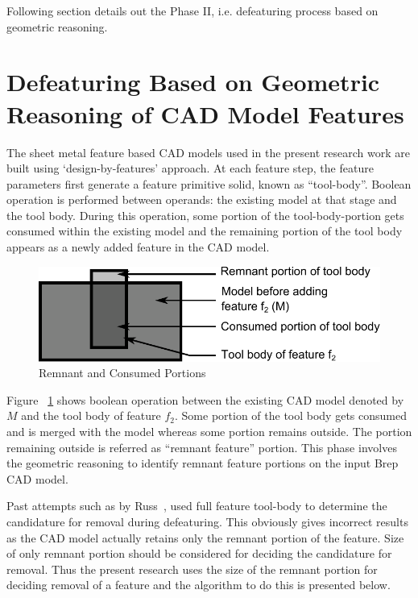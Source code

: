 Following section details out the Phase II, i.e. defeaturing process based on geometric reasoning.

 
\section{Defeaturing Based on Geometric Reasoning of CAD Model Features} \label{sec:defeaturing:phase2}


The sheet metal feature based CAD models used in the present research work are built using `design-by-features' approach. At each feature step, the feature parameters first generate a feature primitive solid, known as ``tool-body''. Boolean operation is  performed between operands: the existing model at that stage and the tool body. During this operation, some portion of the tool-body-portion gets consumed within the existing model and the remaining portion of the tool body appears as a newly added feature in the CAD model. 



 	\begin{figure} [!h]
		\centering
\includegraphics[width=0.62\linewidth,valign=t]{images/Solid_Simple_SmallProtrusion_labels_2.pdf}
		\caption{Remnant and Consumed Portions} \label{fig_remnant}
	\end{figure}
	

Figure ~\ref{fig_remnant} shows boolean operation between the existing CAD model denoted by  $M$ and the tool body of feature $f_2$. Some portion of the tool body gets consumed and is merged with the model whereas some portion remains outside. The portion remaining outside is referred as ``remnant feature'' portion. This phase involves the geometric reasoning to identify remnant feature portions on the input Brep CAD model.

Past attempts such as by Russ~\cite{Russ2012}, used full feature tool-body to determine the candidature for removal during defeaturing. This obviously gives incorrect results as the CAD model actually retains only the remnant portion of the feature. Size of only remnant portion should be considered for deciding the candidature for removal. Thus the present research  uses the size of the remnant portion for deciding removal of a feature and the algorithm to do this is presented below.


